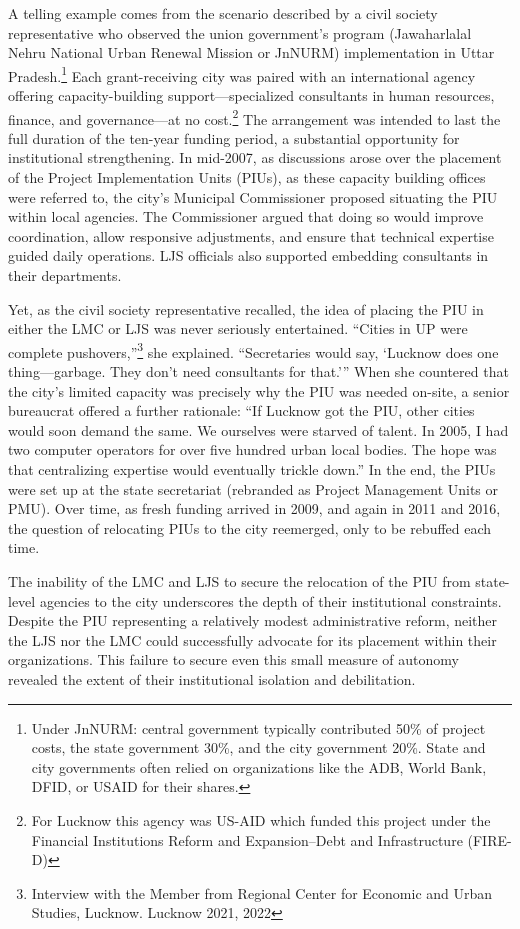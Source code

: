 A telling example comes from the scenario described by a civil society representative who observed the union government's program (Jawaharlalal Nehru National Urban Renewal Mission or JnNURM) implementation in Uttar Pradesh.\footnote{Under JnNURM: central government typically contributed 50\% of project costs, the state government 30\%, and the
city government 20\%. State and city governments often relied on organizations like the ADB, World Bank, DFID, or
USAID for their shares.} Each grant-receiving city was paired with an international agency offering capacity-building support—specialized consultants in human resources, finance, and governance—at no cost.\footnote{ For Lucknow this agency was US-AID which funded this project under the Financial Institutions Reform and Expansion–Debt and Infrastructure (FIRE-D)} The arrangement was intended to last the full duration of the ten-year funding period, a substantial opportunity for institutional strengthening. In mid-2007, as discussions arose over the placement of the Project Implementation Units (PIUs), as these capacity building offices were referred to, the city’s Municipal Commissioner proposed situating the PIU within local agencies. The Commissioner argued that doing so would improve coordination, allow responsive adjustments, and ensure that technical expertise guided daily operations. LJS officials also supported embedding consultants in their departments.

Yet, as the civil society representative recalled, the idea of placing the PIU in either the LMC or LJS was never seriously entertained. “Cities in UP were complete pushovers,”\footnote{Interview with the Member from Regional Center for Economic and Urban Studies, Lucknow. Lucknow 2021, 2022} she explained. “Secretaries would say, ‘Lucknow does one thing—garbage. They don’t need consultants for that.’” When she countered that the city’s limited capacity was precisely why the PIU was needed on-site, a senior bureaucrat offered a further rationale: “If Lucknow got the PIU, other cities would soon demand the same. We ourselves were starved of talent. In 2005, I had two computer operators for over five hundred urban local bodies. The hope was that centralizing expertise would eventually trickle down.” In the end, the PIUs were set up at the state secretariat (rebranded as Project Management Units or PMU). Over time, as fresh funding arrived in 2009, and again in 2011 and 2016, the question of relocating PIUs to the city reemerged, only to be rebuffed each time.

The inability of the LMC and LJS to secure the relocation of the PIU from state-level agencies to the city underscores the depth of their institutional constraints. Despite the PIU representing a relatively modest administrative reform, neither the LJS nor the LMC could successfully advocate for its placement within their organizations. This failure to secure even this small measure of autonomy revealed the extent of their institutional isolation and debilitation.

